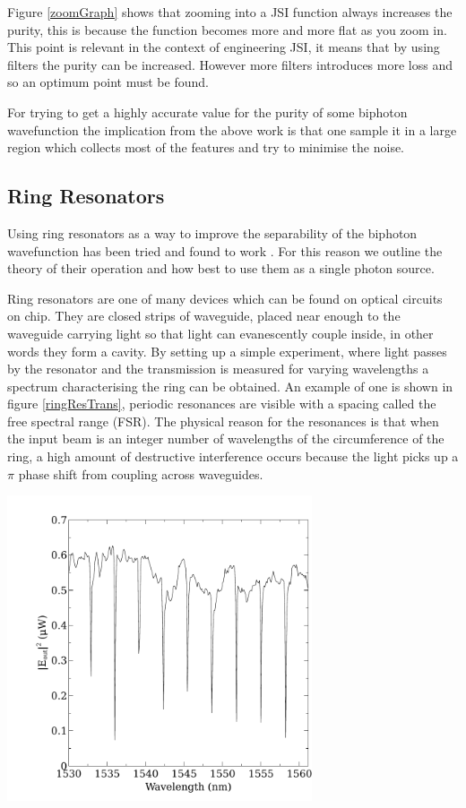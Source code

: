 Figure \ref{zoomGraph} shows that zooming into a JSI function always increases the purity, this is because the function becomes more and more flat as you zoom in. This point is relevant in the context of engineering JSI, it means that by using filters the purity can be increased. However more filters introduces more loss and so an optimum point must be found.

For trying to get a highly accurate value for the purity of some biphoton wavefunction the implication from the above work is that one sample it in a large region which collects most of the features and try to minimise the noise.

\subsection{Ring Resonators} \label{resSect}
Using ring resonators as a way to improve the separability of the biphoton wavefunction has been tried and found to work \cite{silverstone_qubit_2014}. For this reason we outline the theory of their operation and how best to use them as a single photon source.


Ring resonators are one of many devices which can be found on optical circuits on chip. They are closed strips of waveguide, placed near enough to the waveguide carrying light so that light can evanescently couple inside, in other words they form a cavity. By setting up a simple experiment, where light passes by the resonator and the transmission is measured for varying wavelengths a spectrum characterising the ring can be obtained. An example of one is shown in figure \ref{ringResTrans}, periodic resonances are visible with a spacing called the free spectral range (FSR). The physical reason for the resonances is that when the input beam is an integer number of wavelengths of the circumference of the ring, a high amount of destructive interference occurs because the light picks up a $\pi$ phase shift from coupling across waveguides.

\begingroup
\centering
    \includegraphics[width=9cm]{img/theory/ringTransmission.pdf}
 \label{ringResTrans}
\endgroup


